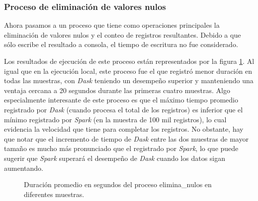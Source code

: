 \subsubsection{Proceso de eliminación de valores nulos}

Ahora pasamos a un proceso que tiene como operaciones principales la eliminación de valores nulos y el conteo de registros resultantes. Debido a que sólo escribe el resultado a consola, el tiempo de escritura no fue considerado.

Los resultados de ejecución de este proceso están representados por la figura \ref{lineas:nube-elimina-nulos}. Al igual que en la ejecución local, este proceso fue el que registró menor duración en todas las muestras, con \textit{Dask} teniendo un desempeño superior y manteniendo una ventaja cercana a 20 segundos durante las primeras cuatro muestras. Algo especialmente interesante de este proceso es que el máximo tiempo promedio registrado por \textit{Dask} (cuando procesa el total de los registros) es inferior que el mínimo registrado por \textit{Spark} (en la muestra de 100 mil registros), lo cual evidencia la velocidad que tiene para completar los registros. No obstante, hay que notar que el incremento de tiempo de \textit{Dask} entre las dos muestras de mayor tamaño es mucho más pronunciado que el registrado por \textit{Spark}, lo que puede sugerir que \textit{Spark} superará el desempeño de \textit{Dask} cuando los datos sigan aumentando. 

\begin{figure}
\centering
{}
\caption{Duración promedio en segundos del proceso elimina\_nulos en diferentes muestras.}
\label{lineas:nube-elimina-nulos}
\end{figure}

